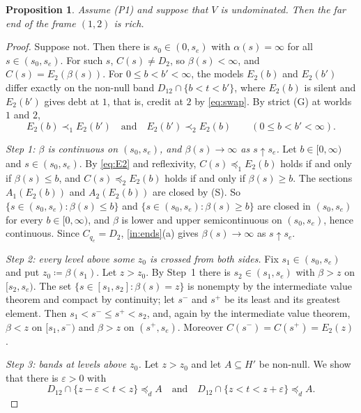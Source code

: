 \documentclass[11pt]{article}
\newtheorem{proposition}[theorem]{Proposition}
\theoremstyle{definition}\newtheorem{definition}[theorem]{Definition}
\theoremstyle{remark}\newtheorem{remark}[theorem]{Remark}
\begin{document}
\begin{proposition}\label{prop:rich}
Assume (P1) and suppose that $V$ is undominated. Then the far end of the
frame $(1,2)$ is rich.
\end{proposition}
\begin{proof}
Suppose not. Then there is $s_0\in(0,s_e)$ with $\alpha(s)=\infty$ for all
$s\in(s_0,s_e)$. For such $s$, $C(s)\ne D_2$, so $\beta(s)<\infty$, and
$C(s)=E_2(\beta(s))$. For $0\le b<b'<\infty$, the models $E_2(b)$ and
$E_2(b')$ differ exactly on the non-null band $D_{12}\cap\{b<t<b'\}$, where
$E_2(b)$ is silent and $E_2(b')$ gives debt at $1$, that is, credit at $2$
by \eqref{eq:swap}. By strict (G) at worlds $1$ and $2$,
\begin{equation}
 E_2(b)\prec_1E_2(b')\quad\text{and}\quad E_2(b')\prec_2E_2(b)
 \qquad(0\le b<b'<\infty).
 \label{eq:E2}
\end{equation}

\emph{Step 1: $\beta$ is continuous on $(s_0,s_e)$, and $\beta(s)\to\infty$
as $s\uparrow s_e$.} Let $b\in[0,\infty)$ and $s\in(s_0,s_e)$. By
\eqref{eq:E2} and reflexivity, $C(s)\preceq_1E_2(b)$ holds if and only if
$\beta(s)\le b$, and $C(s)\preceq_2E_2(b)$ holds if and only if
$\beta(s)\ge b$. The sections $A_1(E_2(b))$ and $A_2(E_2(b))$ are closed by
(S). So $\{s\in(s_0,s_e):\beta(s)\le b\}$ and
$\{s\in(s_0,s_e):\beta(s)\ge b\}$ are closed in $(s_0,s_e)$ for every
$b\in[0,\infty)$, and $\beta$ is lower and upper semicontinuous on
$(s_0,s_e)$, hence continuous. Since $C_{q_e}=D_2$, \ref{in:ends}(a) gives
$\beta(s)\to\infty$ as $s\uparrow s_e$.

\emph{Step 2: every level above some $z_0$ is crossed from both sides.}
Fix $s_1\in(s_0,s_e)$ and put $z_0\coloneqq\beta(s_1)$. Let $z>z_0$. By Step~1 there
is $s_2\in(s_1,s_e)$ with $\beta>z$ on $[s_2,s_e)$. The set
$\{s\in[s_1,s_2]:\beta(s)=z\}$ is nonempty by the intermediate value theorem
and compact by continuity; let $s^-$ and $s^+$ be its least and its greatest
element. Then $s_1<s^-\le s^+<s_2$, and, again by the intermediate value
theorem, $\beta<z$ on $[s_1,s^-)$ and $\beta>z$ on $(s^+,s_e)$. Moreover
$C(s^-)=C(s^+)=E_2(z)$.

\emph{Step 3: bands at levels above $z_0$.} Let $z>z_0$ and let $A\subseteq H'$
be non-null. We show that there is $\varepsilon>0$ with
\begin{equation}
 D_{12}\cap\{z-\varepsilon<t<z\}\preceq_dA\quad\text{and}\quad
 D_{12}\cap\{z<t<z+\varepsilon\}\preceq_dA.
 \label{eq:bands}
\end{equation}


\end{proof}
\end{document}
